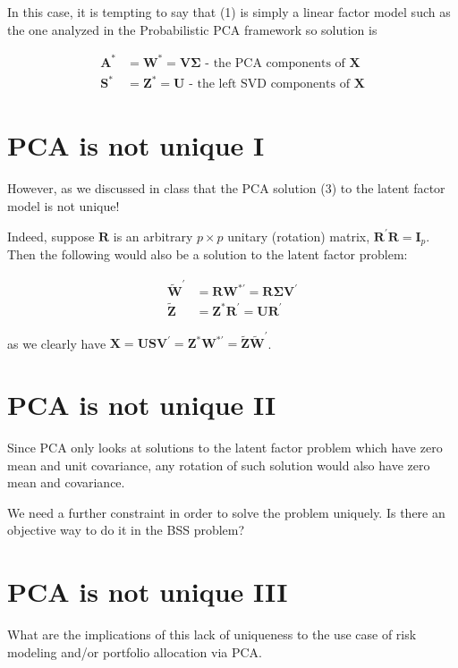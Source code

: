 \documentclass[11pt]{article}
\theoremstyle{plain} %
\theoremstyle{remark}
\begin{document}
In this case, it is tempting to say that (1) is simply a linear factor model
such as the one analyzed in the Probabilistic PCA framework so solution is

$$
\begin{aligned}
\mathbf{A}^{*} & =\mathbf{W}^{*}=\mathbf{V} \boldsymbol{\Sigma} \text { - the PCA components of } \mathbf{X} \\
\mathbf{S}^{*} & =\mathbf{Z}^{*}=\mathbf{U} \text { - the left SVD components of } \mathbf{X}
\end{aligned}
$$

\section*{PCA is not unique I}
However, as we discussed in class that the PCA solution (3) to the latent factor
model is not unique!

Indeed, suppose $\mathbf{R}$ is an arbitrary $p \times p$ unitary (rotation)
matrix, $\mathbf{R}^{\prime} \mathbf{R}=\mathbf{I}_{p}$. Then the following
would also be a solution to the latent factor problem:

$$
\begin{aligned}
\tilde{\mathbf{W}}^{\prime} & =\mathbf{R} \mathbf{W}^{* \prime}=\mathbf{R} \mathbf{\Sigma} \mathbf{V}^{\prime} \\
\tilde{\mathbf{Z}} & =\mathbf{Z}^{*} \mathbf{R}^{\prime}=\mathbf{U R}^{\prime}
\end{aligned}
$$

as we clearly have $\mathbf{X}=\mathbf{U S V}^{\prime}=\mathbf{Z}^{*}
\mathbf{W}^{* \prime}=\tilde{\mathbf{Z}} \tilde{\mathbf{W}}^{\prime}$.

\section*{PCA is not unique II}
Since PCA only looks at solutions to the latent factor problem which have zero
mean and unit covariance, any rotation of such solution would also have zero
mean and covariance.

We need a further constraint in order to solve the problem uniquely. Is there an
objective way to do it in the BSS problem?

\section*{PCA is not unique III}
What are the implications of this lack of uniqueness to the use case of risk
modeling and/or portfolio allocation via PCA.
\end{document}
